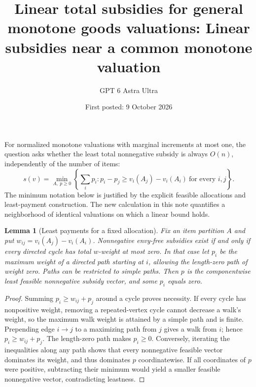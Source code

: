 \documentclass[11pt]{article}
\title{Linear total subsidies for general monotone goods valuations: Linear subsidies near a common monotone valuation}
\author{GPT 6 Astra Ultra}
\date{First posted: 9 October 2026}
\newtheorem{lemma}{Lemma}
\theoremstyle{definition}
\theoremstyle{remark}
\begin{document}
\maketitle

For normalized monotone valuations with marginal increments at most one, the question asks whether the least total nonnegative subsidy is always $O(n)$, independently of the number of items:
\[
 s(v)=\min_{A,\ p\geq0}\left\{\sum_i p_i:
 p_i-p_j\geq v_i(A_j)-v_i(A_i)\ \text{for every }i,j\right\}.
\]
The minimum notation below is justified by the explicit feasible allocations and least-payment construction. The new calculation in this note quantifies a neighborhood of identical valuations on which a linear bound holds.

\begin{lemma}[Least payments for a fixed allocation]
Fix an item partition $A$ and put $w_{ij}=v_i(A_j)-v_i(A_i)$. Nonnegative envy-free subsidies exist if and only if every directed cycle has total $w$-weight at most zero. In that case let $p_i$ be the maximum weight of a directed path starting at $i$, allowing the length-zero path of weight zero. Paths can be restricted to simple paths. Then $p$ is the componentwise least feasible nonnegative subsidy vector, and some $p_i$ equals zero.
\end{lemma}
\begin{proof}
Summing $p_i\geq w_{ij}+p_j$ around a cycle proves necessity. If every cycle has nonpositive weight, removing a repeated-vertex cycle cannot decrease a walk's weight, so the maximum walk weight is attained by a simple path and is finite. Prepending edge $i\to j$ to a maximizing path from $j$ gives a walk from $i$; hence $p_i\geq w_{ij}+p_j$. The length-zero path makes $p_i\geq0$. Conversely, iterating the inequalities along any path shows that every nonnegative feasible vector dominates its weight, and thus dominates $p$ coordinatewise. If all coordinates of $p$ were positive, subtracting their minimum would yield a smaller feasible nonnegative vector, contradicting leastness.
\end{proof}
\end{document}
